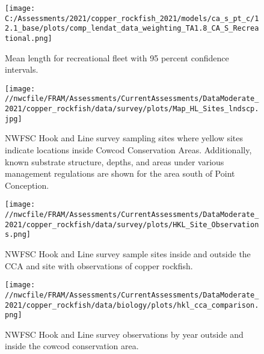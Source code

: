 \documentclass[11pt,
  english,
  a4paper,
]{article}
\begin{document}
\begin{figure}
\centering
\texttt{[image: C:/Assessments/2021/copper\_rockfish\_2021/models/ca\_s\_pt\_c/12.1\_base/plots/comp\_lendat\_data\_weighting\_TA1.8\_CA\_S\_Recreational.png]}
\caption{Mean length for recreational fleet with 95 percent confidence intervals.\label{fig:mean-rec-len-data}}
\end{figure}

\tagmcend\tagstructend


\begin{figure}
\centering
\texttt{[image: //nwcfile/FRAM/Assessments/CurrentAssessments/DataModerate\_2021/copper\_rockfish/data/survey/plots/Map\_HL\_Sites\_lndscp.jpg]}
\caption{NWFSC Hook and Line survey sampling sites where yellow sites indicate locations inside Cowcod Conservation Areas. Additionally, known substrate structure, depths, and areas under various management regulations are shown for the area south of Point Conception.\label{fig:hkl-sites}}
\end{figure}

\tagmcend\tagstructend


\begin{figure}
\centering
\texttt{[image: //nwcfile/FRAM/Assessments/CurrentAssessments/DataModerate\_2021/copper\_rockfish/data/survey/plots/HKL\_Site\_Observations.png]}
\caption{NWFSC Hook and Line survey sample sites inside and outside the CCA and site with observations of copper rockfish.\label{fig:hkl-site-ob}}
\end{figure}

\tagmcend\tagstructend


\begin{figure}
\centering
\texttt{[image: //nwcfile/FRAM/Assessments/CurrentAssessments/DataModerate\_2021/copper\_rockfish/data/biology/plots/hkl\_cca\_comparison.png]}
\caption{NWFSC Hook and Line survey observations by year outside and inside the cowcod conservation area.\label{fig:hkl-cca}}
\end{figure}
\end{document}
